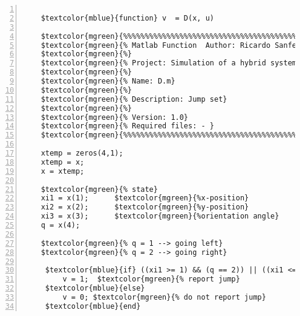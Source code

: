 %  
%  
%  
%  
  
  
\DefineShortVerb[fontfamily=courier,fontseries=m]{\$} 
\DefineShortVerb[fontfamily=courier,fontseries=b]{\#} 
  
\begin{Verbatim}[commandchars=\$\{\},numbers=left,numbersep=2pt] 

    $textcolor{mblue}{function} v  = D(x, u)  
     
    $textcolor{mgreen}{%%%%%%%%%%%%%%%%%%%%%%%%%%%%%%%%%%%%%%%%%%%%%%%%%%%%%%%%%%%%%%%%%%%%%%%%%%%} 
    $textcolor{mgreen}{% Matlab Function  Author: Ricardo Sanfelice} 
    $textcolor{mgreen}{%} 
    $textcolor{mgreen}{% Project: Simulation of a hybrid system (Vehicle Traveling on a Track)} 
    $textcolor{mgreen}{%} 
    $textcolor{mgreen}{% Name: D.m} 
    $textcolor{mgreen}{%} 
    $textcolor{mgreen}{% Description: Jump set} 
    $textcolor{mgreen}{%} 
    $textcolor{mgreen}{% Version: 1.0} 
    $textcolor{mgreen}{% Required files: - } 
    $textcolor{mgreen}{%%%%%%%%%%%%%%%%%%%%%%%%%%%%%%%%%%%%%%%%%%%%%%%%%%%%%%%%%%%%%%%%%%%%%%%%%%%} 
     
    xtemp = zeros(4,1); 
    xtemp = x; 
    x = xtemp; 
     
    $textcolor{mgreen}{% state} 
    xi1 = x(1);      $textcolor{mgreen}{%x-position} 
    xi2 = x(2);      $textcolor{mgreen}{%y-position} 
    xi3 = x(3);      $textcolor{mgreen}{%orientation angle} 
    q = x(4);   
     
    $textcolor{mgreen}{% q = 1 --> going left} 
    $textcolor{mgreen}{% q = 2 --> going right} 
     
     $textcolor{mblue}{if} ((xi1 >= 1) && (q == 2)) || ((xi1 <= -1) && (q == 1))  $textcolor{mgreen}{% jump condition} 
         v = 1;  $textcolor{mgreen}{% report jump} 
     $textcolor{mblue}{else}  
         v = 0; $textcolor{mgreen}{% do not report jump} 
     $textcolor{mblue}{end}  
\end{Verbatim}  
  
\UndefineShortVerb{\$} 
\UndefineShortVerb{\#} 
 